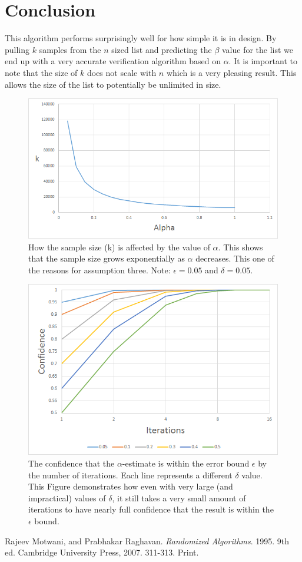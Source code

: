 \documentclass[11pt]{article}
\begin{document}
\section{Conclusion}

This algorithm performs surprisingly well for how simple it is in design. By pulling $k$ samples from the $n$ sized list and predicting the $\beta$ value for the list we end up with a very accurate verification algorithm based on $\alpha$. It is important to note that the size of $k$ does not scale with $n$ which is a very pleasing result. This allows the size of the list to potentially be unlimited in size.  

\newpage
\begin{appendices}

\begin{figure}[h!]
	\centering
	\includegraphics[width=0.7\linewidth]{fig1.png}
	\caption{How the sample size (k) is affected by the value of $\alpha$.		
		This shows that the sample size grows exponentially as $\alpha$ decreases. This one of the reasons for assumption three.
		Note: $\epsilon=0.05$ and $\delta=0.05$.}
\end{figure}

\begin{figure}[h!]
	\centering
	\includegraphics[width=0.7\linewidth]{fig2.png}
	\caption{The confidence that the $\alpha$-estimate is within the error bound $\epsilon$ by the number of iterations. Each line represents a different $\delta$ value. This Figure demonstrates how even with very large (and impractical) values of $\delta$, it still takes a very small amount of iterations to have nearly full confidence that the result is within the $\epsilon$ bound.}
\end{figure}
\end{appendices}

\newpage
{}
\begin{thebibliography}{2}

Rajeev Motwani, and Prabhakar Raghavan.
\textit{Randomized Algorithms}. 1995. 9th ed.
Cambridge University Press, 2007.
311-313. Print.

\end{thebibliography}
\end{document}
